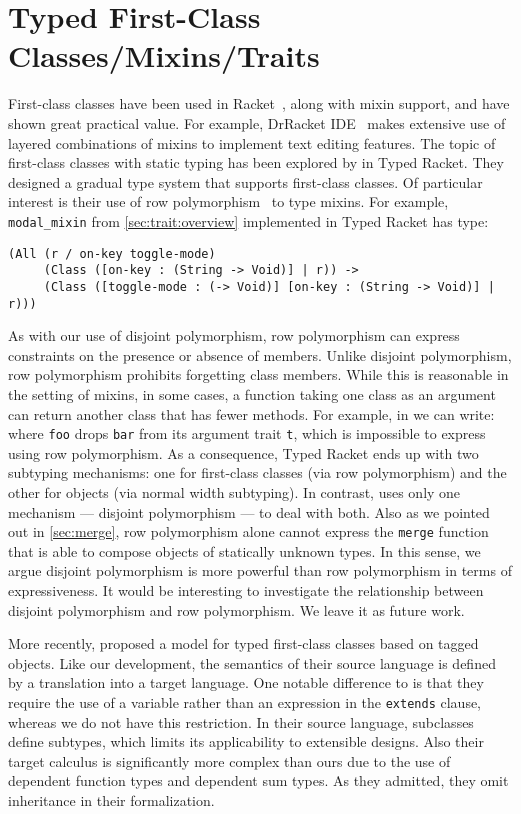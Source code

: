\section{Typed First-Class Classes/Mixins/Traits}

First-class classes have been used in Racket~\citep{DBLP:conf/aplas/FlattFF06},
along with mixin support, and have shown great practical value. For example,
DrRacket IDE~\citep{DBLP:journals/jfp/FindlerCFFKSF02} makes extensive use of
layered combinations of mixins to implement text editing features. The topic of
first-class classes with static typing has been explored by
\citet{DBLP:conf/oopsla/TakikawaSDTF12} in Typed Racket. They designed a gradual
type system that supports first-class classes. Of particular interest is their
use of row polymorphism~\citep{wand1994type} to type mixins. For example,
\lstinline{modal_mixin} from \cref{sec:trait:overview} implemented in Typed
Racket has type:
\begin{lstlisting}
(All (r / on-key toggle-mode)
     (Class ([on-key : (String -> Void)] | r)) ->
     (Class ([toggle-mode : (-> Void)] [on-key : (String -> Void)] | r)))
\end{lstlisting}
As with our use of disjoint polymorphism, row polymorphism can express
constraints on the presence or absence of members. Unlike disjoint polymorphism,
row polymorphism prohibits forgetting class members. While this is reasonable in
the setting of mixins, in some cases, a function taking one class as an argument
can return another class that has fewer methods. For example, in \sedel we can write:
where \lstinline{foo} drops \lstinline{bar} from its argument trait
\lstinline{t}, which is impossible to express using row polymorphism. As a
consequence, Typed Racket ends up with two subtyping mechanisms: one for
first-class classes (via row polymorphism) and the other for objects (via normal
width subtyping). In contrast, \sedel uses only one mechanism --- disjoint
polymorphism --- to deal with both. Also as we pointed out in \cref{sec:merge},
row polymorphism alone cannot express the \lstinline{merge} function that is
able to compose objects of statically unknown types. In this sense, we argue
disjoint polymorphism is more powerful than row polymorphism in terms of
expressiveness. It would be interesting to investigate the relationship between
disjoint polymorphism and row polymorphism. We leave it as future work.


More recently, \citet{DBLP:conf/ecoop/LeeASP15} proposed a model for typed
first-class classes based on tagged objects. Like our development, the semantics
of their source language is defined by a translation into a target language. One
notable difference to \sedel is that they require the use of a variable rather
than an expression in the \lstinline{extends} clause, whereas we do not have
this restriction. In their source language, subclasses define subtypes, which
limits its applicability to extensible designs. Also their target calculus is
significantly more complex than ours due to the use of dependent function types
and dependent sum types. As they admitted, they omit inheritance in their
formalization.

